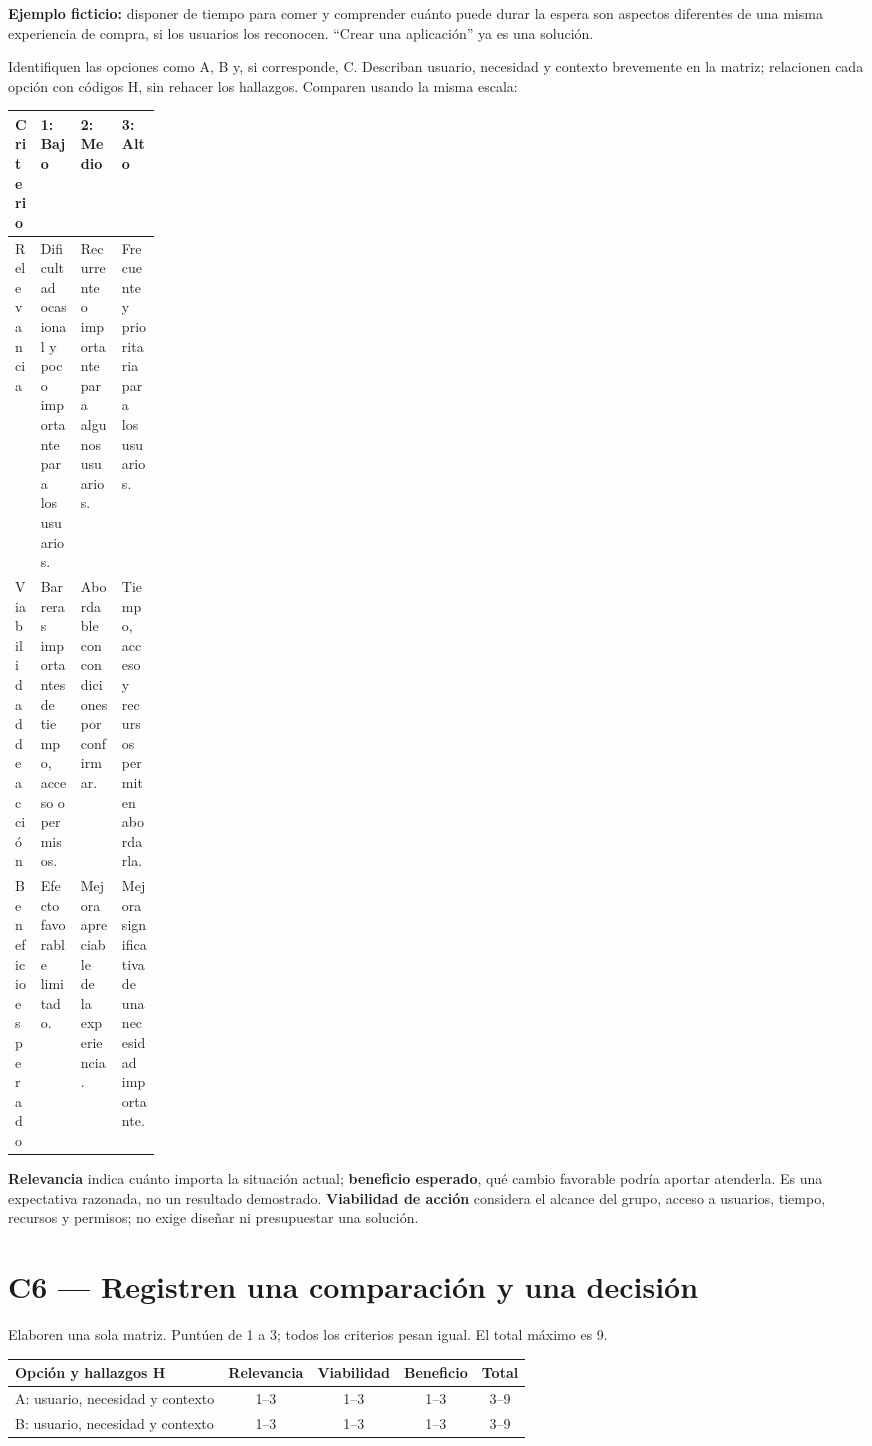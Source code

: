 \documentclass[12pt,a4paper]{article}
\begin{document}
\textbf{Ejemplo ficticio:} disponer de tiempo para comer y comprender cuánto puede durar la espera son aspectos diferentes de una misma experiencia de compra, si los usuarios los reconocen. ``Crear una aplicación'' ya es una solución.

Identifiquen las opciones como A, B y, si corresponde, C. Describan usuario, necesidad y contexto brevemente en la matriz; relacionen cada opción con códigos H, sin rehacer los hallazgos. Comparen usando la misma escala:

{\small
\begin{tabularx}{\linewidth}{|p{0.17\linewidth}|Y|Y|Y|}
\hline
\textbf{Criterio} & \textbf{1: Bajo} & \textbf{2: Medio} & \textbf{3: Alto} \\
\hline
Relevancia & Dificultad ocasional y poco importante para los usuarios. & Recurrente o importante para algunos usuarios. & Frecuente y prioritaria para los usuarios. \\
\hline
Viabilidad de acción & Barreras importantes de tiempo, acceso o permisos. & Abordable con condiciones por confirmar. & Tiempo, acceso y recursos permiten abordarla. \\
\hline
Beneficio esperado & Efecto favorable limitado. & Mejora apreciable de la experiencia. & Mejora significativa de una necesidad importante. \\
\hline
\end{tabularx}}

\textbf{Relevancia} indica cuánto importa la situación actual; \textbf{beneficio esperado}, qué cambio favorable podría aportar atenderla. Es una expectativa razonada, no un resultado demostrado. \textbf{Viabilidad de acción} considera el alcance del grupo, acceso a usuarios, tiempo, recursos y permisos; no exige diseñar ni presupuestar una solución.

\section*{C6 --- Registren una comparación y una decisión}
Elaboren una sola matriz. Puntúen de 1 a 3; todos los criterios pesan igual. El total máximo es 9.

{\small
\begin{tabularx}{\linewidth}{|Y|c|c|c|c|}
\hline
\textbf{Opción y hallazgos H} & \textbf{Relevancia} & \textbf{Viabilidad} & \textbf{Beneficio} & \textbf{Total} \\
\hline
A: usuario, necesidad y contexto & 1--3 & 1--3 & 1--3 & 3--9 \\
\hline
B: usuario, necesidad y contexto & 1--3 & 1--3 & 1--3 & 3--9 \\
\hline
\end{tabularx}}
\end{document}
